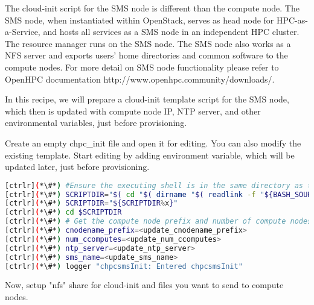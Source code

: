 	The cloud-init script for the SMS node is different than the compute node. The SMS node, when instantiated within OpenStack, serves as head node for HPC-as-a-Service, and hosts all services as a SMS node in an independent HPC cluster. The resource manager runs on the SMS node. The SMS node also works as a NFS server and exports users’ home directories and common software to the compute nodes. For more detail on SMS node functionality please refer to OpenHPC documentation http://www.openhpc.community/downloads/.

	In this recipe, we will prepare a cloud-init template script for the SMS node, which then is updated with compute node IP, NTP server, and other environmental variables, just before provisioning. 

	Create an empty chpc\_init file and open it for editing. You can also modify the existing template. Start editing by adding environment variable, which will be updated later, just before provisioning.



\begin{lstlisting}[language=bash,keywords={}]
[ctrlr](*\#*) #Ensure the executing shell is in the same directory as the script.
[ctrlr](*\#*) SCRIPTDIR="$( cd "$( dirname "$( readlink -f "${BASH_SOURCE[0]}" )" )" && pwd -P && echo x)"
[ctrlr](*\#*) SCRIPTDIR="${SCRIPTDIR%x}"
[ctrlr](*\#*) cd $SCRIPTDIR
[ctrlr](*\#*) # Get the compute node prefix and number of compute nodes
[ctrlr](*\#*) cnodename_prefix=<update_cnodename_prefix>
[ctrlr](*\#*) num_ccomputes=<update_num_ccomputes>
[ctrlr](*\#*) ntp_server=<update_ntp_server>
[ctrlr](*\#*) sms_name=<update_sms_name>
[ctrlr](*\#*) logger "chpcsmsInit: Entered chpcsmsInit"

\end{lstlisting} 

	Now, setup "nfs" share for cloud-init and files you want to send to compute nodes.


